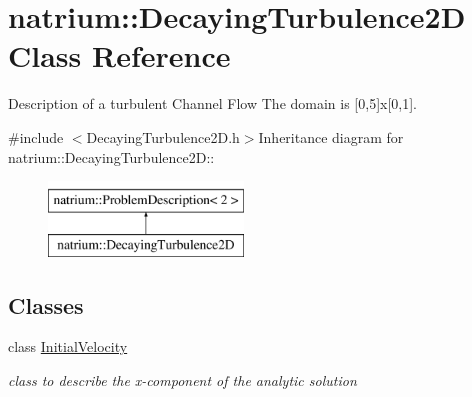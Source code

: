 \hypertarget{classnatrium_1_1DecayingTurbulence2D}{
\section{natrium::DecayingTurbulence2D Class Reference}
\label{classnatrium_1_1DecayingTurbulence2D}
}


Description of a turbulent Channel Flow The domain is \mbox{[}0,5\mbox{]}x\mbox{[}0,1\mbox{]}.  


{\ttfamily \#include $<$DecayingTurbulence2D.h$>$}Inheritance diagram for natrium::DecayingTurbulence2D::\begin{figure}[H]
\begin{center}
\leavevmode
\includegraphics[height=2cm]{classnatrium_1_1DecayingTurbulence2D}
\end{center}
\end{figure}
\subsection*{Classes}
\begin{DoxyCompactItemize}
\item 
class \hyperlink{classnatrium_1_1DecayingTurbulence2D_1_1InitialVelocity}{InitialVelocity}
\begin{DoxyCompactList}\small\item\em class to describe the x-\/component of the analytic solution \item\end{DoxyCompactList}\end{DoxyCompactItemize}
